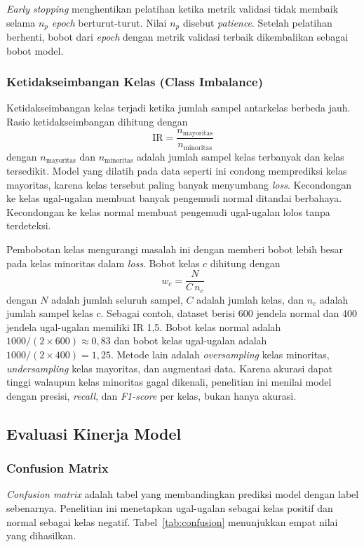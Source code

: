 \textit{Early stopping} menghentikan pelatihan ketika metrik validasi tidak membaik selama $n_{p}$ \textit{epoch} berturut-turut. Nilai $n_{p}$ disebut \textit{patience}. Setelah pelatihan berhenti, bobot dari \textit{epoch} dengan metrik validasi terbaik dikembalikan sebagai bobot model.

\subsubsection{Ketidakseimbangan Kelas (Class Imbalance)}
Ketidakseimbangan kelas terjadi ketika jumlah sampel antarkelas berbeda jauh. Rasio ketidakseimbangan dihitung dengan
\begin{equation}
  \mathrm{IR} = \frac{n_{\mathrm{mayoritas}}}{n_{\mathrm{minoritas}}}
  \label{eq:ir}
\end{equation}
dengan $n_{\mathrm{mayoritas}}$ dan $n_{\mathrm{minoritas}}$ adalah jumlah sampel kelas terbanyak dan kelas tersedikit. Model yang dilatih pada data seperti ini condong memprediksi kelas mayoritas, karena kelas tersebut paling banyak menyumbang \textit{loss}. Kecondongan ke kelas ugal-ugalan membuat banyak pengemudi normal ditandai berbahaya. Kecondongan ke kelas normal membuat pengemudi ugal-ugalan lolos tanpa terdeteksi.

Pembobotan kelas mengurangi masalah ini dengan memberi bobot lebih besar pada kelas minoritas dalam \textit{loss}. Bobot kelas $c$ dihitung dengan
\begin{equation}
  w_{c} = \frac{N}{C\,n_{c}}
  \label{eq:bobot-kelas}
\end{equation}
dengan $N$ adalah jumlah seluruh sampel, $C$ adalah jumlah kelas, dan $n_{c}$ adalah jumlah sampel kelas $c$. Sebagai contoh, dataset berisi 600 jendela normal dan 400 jendela ugal-ugalan memiliki IR 1,5. Bobot kelas normal adalah $1000/(2 \times 600) \approx 0{,}83$ dan bobot kelas ugal-ugalan adalah $1000/(2 \times 400) = 1{,}25$. Metode lain adalah \textit{oversampling} kelas minoritas, \textit{undersampling} kelas mayoritas, dan augmentasi data. Karena akurasi dapat tinggi walaupun kelas minoritas gagal dikenali, penelitian ini menilai model dengan presisi, \textit{recall}, dan \textit{F1-score} per kelas, bukan hanya akurasi.

\subsection{Evaluasi Kinerja Model}
\subsubsection{Confusion Matrix}
\textit{Confusion matrix} adalah tabel yang membandingkan prediksi model dengan label sebenarnya. Penelitian ini menetapkan ugal-ugalan sebagai kelas positif dan normal sebagai kelas negatif. Tabel~\ref{tab:confusion} menunjukkan empat nilai yang dihasilkan.

